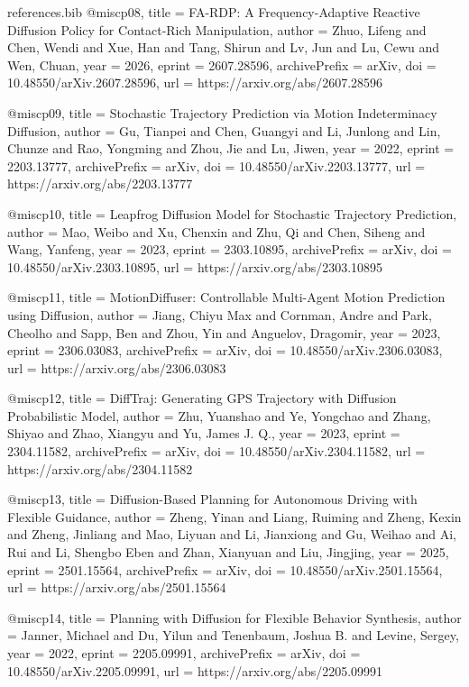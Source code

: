 \begin{filecontents*}{references.bib}
@misc{p08,
  title = {{FA-RDP: A Frequency-Adaptive Reactive Diffusion Policy for Contact-Rich Manipulation}},
  author = {Zhuo, Lifeng and Chen, Wendi and Xue, Han and Tang, Shirun and Lv, Jun and Lu, Cewu and Wen, Chuan},
  year = {2026},
  eprint = {2607.28596},
  archivePrefix = {arXiv},
  doi = {10.48550/arXiv.2607.28596},
  url = {https://arxiv.org/abs/2607.28596}
}

@misc{p09,
  title = {{Stochastic Trajectory Prediction via Motion Indeterminacy Diffusion}},
  author = {Gu, Tianpei and Chen, Guangyi and Li, Junlong and Lin, Chunze and Rao, Yongming and Zhou, Jie and Lu, Jiwen},
  year = {2022},
  eprint = {2203.13777},
  archivePrefix = {arXiv},
  doi = {10.48550/arXiv.2203.13777},
  url = {https://arxiv.org/abs/2203.13777}
}

@misc{p10,
  title = {{Leapfrog Diffusion Model for Stochastic Trajectory Prediction}},
  author = {Mao, Weibo and Xu, Chenxin and Zhu, Qi and Chen, Siheng and Wang, Yanfeng},
  year = {2023},
  eprint = {2303.10895},
  archivePrefix = {arXiv},
  doi = {10.48550/arXiv.2303.10895},
  url = {https://arxiv.org/abs/2303.10895}
}

@misc{p11,
  title = {{MotionDiffuser: Controllable Multi-Agent Motion Prediction using Diffusion}},
  author = {Jiang, Chiyu Max and Cornman, Andre and Park, Cheolho and Sapp, Ben and Zhou, Yin and Anguelov, Dragomir},
  year = {2023},
  eprint = {2306.03083},
  archivePrefix = {arXiv},
  doi = {10.48550/arXiv.2306.03083},
  url = {https://arxiv.org/abs/2306.03083}
}

@misc{p12,
  title = {{DiffTraj: Generating GPS Trajectory with Diffusion Probabilistic Model}},
  author = {Zhu, Yuanshao and Ye, Yongchao and Zhang, Shiyao and Zhao, Xiangyu and Yu, James J. Q.},
  year = {2023},
  eprint = {2304.11582},
  archivePrefix = {arXiv},
  doi = {10.48550/arXiv.2304.11582},
  url = {https://arxiv.org/abs/2304.11582}
}

@misc{p13,
  title = {{Diffusion-Based Planning for Autonomous Driving with Flexible Guidance}},
  author = {Zheng, Yinan and Liang, Ruiming and Zheng, Kexin and Zheng, Jinliang and Mao, Liyuan and Li, Jianxiong and Gu, Weihao and Ai, Rui and Li, Shengbo Eben and Zhan, Xianyuan and Liu, Jingjing},
  year = {2025},
  eprint = {2501.15564},
  archivePrefix = {arXiv},
  doi = {10.48550/arXiv.2501.15564},
  url = {https://arxiv.org/abs/2501.15564}
}

@misc{p14,
  title = {{Planning with Diffusion for Flexible Behavior Synthesis}},
  author = {Janner, Michael and Du, Yilun and Tenenbaum, Joshua B. and Levine, Sergey},
  year = {2022},
  eprint = {2205.09991},
  archivePrefix = {arXiv},
  doi = {10.48550/arXiv.2205.09991},
  url = {https://arxiv.org/abs/2205.09991}
}


\end{filecontents*}
